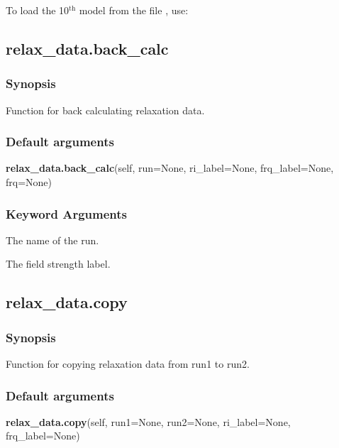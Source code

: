 To load the 10$^\mathrm{th}$ model from the file 
, use:





\newpage

\subsection{relax\_data.back\_calc}


\subsubsection{Synopsis}

Function for back calculating relaxation data.

\subsubsection{Default arguments}

\textsf{\textbf{relax\_data.back\_calc}(self, run=None, ri\_label=None, frq\_label=None, frq=None)}


\subsubsection{Keyword Arguments}

  The name of the run.

  The field strength label.


\newpage

\subsection{relax\_data.copy}


\subsubsection{Synopsis}

Function for copying relaxation data from run1 to run2.

\subsubsection{Default arguments}

\textsf{\textbf{relax\_data.copy}(self, run1=None, run2=None, ri\_label=None, frq\_label=None)}


